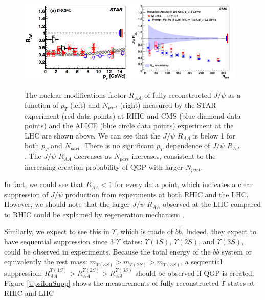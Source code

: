 \begin{figure}[hbtp]
\begin{center}
\includegraphics[width=0.47\textwidth]{Figures/Chapter1/STARPt.png}
\includegraphics[width=0.487\textwidth]{Figures/Chapter1/STARNPart.png}
\caption{The nuclear modifications factor $R_{AA}$ of fully reconstructed $J/\psi$ as a function of $p_{T}$ (left) and $N_{part}$ (right) measured by the STAR experiment (red data points) at RHIC and CMS (blue diamond data points) and the ALICE (blue circle data points) experiment at the LHC are shown above. We can see that the $J/\psi$ $R_{AA}$ is below 1 for both $p_T$ and $N_{part}$. There is no significant $p_T$ dependence of $J/\psi$ $R_{AA}$. The $J/\psi$ $R_{AA}$ decreases as $N_{part}$ increases, consistent to the increasing creation probability of QGP with larger $N_{part}$.}
\label{JPsiSupp}
\end{center}
\end{figure} 

In fact, we could see that $R_{AA} < 1$ for every data point, which indicates a clear suppression of $J/\psi$ production from experiments at both RHIC and the LHC. However, we should note that the larger $J/\psi$ $R_{AA}$ observed at the LHC compared to RHIC could be explained by regeneration mechanism \cite{JPsiRegen}. %

Similarly, we expect to see this in $\Upsilon$, which is made of $b \bar b$. Indeed, they expect to have sequential suppression since 3 $\Upsilon$ states: $\Upsilon(1S)$,  $\Upsilon(2S)$, and $\Upsilon(3S)$, could be observed in experiments. Because the total energy of the $b \bar b$ system or equivalently the rest mass: $m_{\Upsilon(3S)} > m_{\Upsilon(2S)} > m_{\Upsilon(3S)}$, a sequential suppression: $R_{AA}^{\Upsilon(1S)} > R_{AA}^{\Upsilon(2S)} > R_{AA}^{\Upsilon(3S)}$ should be observed if QGP is created. Figure \ref{UpsilonSupp} shows the measurements of fully reconstructed $\Upsilon$ states at RHIC and LHC \cite{STARUpsilonRef,CMSUpsilonRef}

